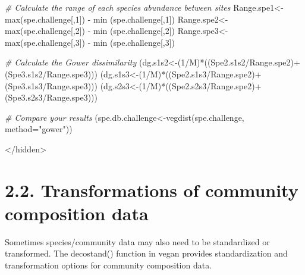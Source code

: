 \documentclass[
]{book}
\newenvironment{Shaded}{\begin{snugshade}}{\end{snugshade}}
\newcommand{\AttributeTok}[1]{\textcolor[rgb]{0.77,0.63,0.00}{#1}}
\newcommand{\CommentTok}[1]{\textcolor[rgb]{0.56,0.35,0.01}{\textit{#1}}}
\newcommand{\DecValTok}[1]{\textcolor[rgb]{0.00,0.00,0.81}{#1}}
\newcommand{\FunctionTok}[1]{\textcolor[rgb]{0.00,0.00,0.00}{#1}}
\newcommand{\NormalTok}[1]{#1}
\newcommand{\OtherTok}[1]{\textcolor[rgb]{0.56,0.35,0.01}{#1}}
\newcommand{\SpecialCharTok}[1]{\textcolor[rgb]{0.00,0.00,0.00}{#1}}
\newcommand{\StringTok}[1]{\textcolor[rgb]{0.31,0.60,0.02}{#1}}
\begin{document}
\begin{Shaded}
\begin{Highlighting}[]
\CommentTok{\# Calculate the range of each species abundance between sites  }
\NormalTok{Range.spe1}\OtherTok{\textless{}{-}}\FunctionTok{max}\NormalTok{(spe.challenge[,}\DecValTok{1}\NormalTok{]) }\SpecialCharTok{{-}} \FunctionTok{min}\NormalTok{ (spe.challenge[,}\DecValTok{1}\NormalTok{])}
\NormalTok{Range.spe2}\OtherTok{\textless{}{-}}\FunctionTok{max}\NormalTok{(spe.challenge[,}\DecValTok{2}\NormalTok{]) }\SpecialCharTok{{-}} \FunctionTok{min}\NormalTok{ (spe.challenge[,}\DecValTok{2}\NormalTok{])}
\NormalTok{Range.spe3}\OtherTok{\textless{}{-}}\FunctionTok{max}\NormalTok{(spe.challenge[,}\DecValTok{3}\NormalTok{]) }\SpecialCharTok{{-}} \FunctionTok{min}\NormalTok{ (spe.challenge[,}\DecValTok{3}\NormalTok{])}

\CommentTok{\# Calculate the Gower dissimilarity  }
\NormalTok{(dg.s1s2}\OtherTok{\textless{}{-}}\NormalTok{(}\DecValTok{1}\SpecialCharTok{/}\NormalTok{M)}\SpecialCharTok{*}\NormalTok{((Spe2.s1s2}\SpecialCharTok{/}\NormalTok{Range.spe2)}\SpecialCharTok{+}\NormalTok{(Spe3.s1s2}\SpecialCharTok{/}\NormalTok{Range.spe3)))}
\NormalTok{(dg.s1s3}\OtherTok{\textless{}{-}}\NormalTok{(}\DecValTok{1}\SpecialCharTok{/}\NormalTok{M)}\SpecialCharTok{*}\NormalTok{((Spe2.s1s3}\SpecialCharTok{/}\NormalTok{Range.spe2)}\SpecialCharTok{+}\NormalTok{(Spe3.s1s3}\SpecialCharTok{/}\NormalTok{Range.spe3)))}
\NormalTok{(dg.s2s3}\OtherTok{\textless{}{-}}\NormalTok{(}\DecValTok{1}\SpecialCharTok{/}\NormalTok{M)}\SpecialCharTok{*}\NormalTok{((Spe2.s2s3}\SpecialCharTok{/}\NormalTok{Range.spe2)}\SpecialCharTok{+}\NormalTok{(Spe3.s2s3}\SpecialCharTok{/}\NormalTok{Range.spe3)))}

\CommentTok{\# Compare your results}
\NormalTok{(spe.db.challenge}\OtherTok{\textless{}{-}}\FunctionTok{vegdist}\NormalTok{(spe.challenge, }\AttributeTok{method=}\StringTok{"gower"}\NormalTok{))}
\end{Highlighting}
\end{Shaded}

\textless/hidden\textgreater{}

\hypertarget{transformations-of-community-composition-data}{%
\section{2.2. Transformations of community composition data}\label{transformations-of-community-composition-data}}

Sometimes species/community data may also need to be standardized or
transformed. The decostand() function in vegan provides standardization
and transformation options for community composition data.
\end{document}
